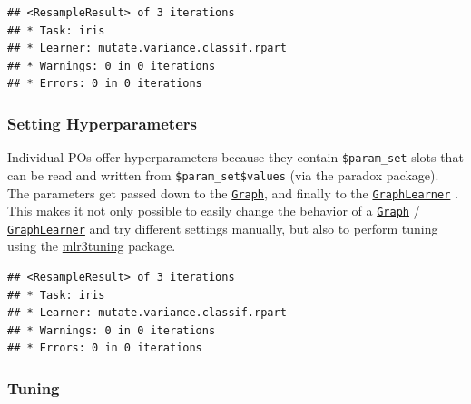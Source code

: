 \documentclass[]{article}
\newenvironment{Shaded}{\begin{snugshade}}{\end{snugshade}}
\newcommand{\DataTypeTok}[1]{\textcolor[rgb]{0.13,0.29,0.53}{#1}}
\newcommand{\DecValTok}[1]{\textcolor[rgb]{0.00,0.00,0.81}{#1}}
\newcommand{\FloatTok}[1]{\textcolor[rgb]{0.00,0.00,0.81}{#1}}
\newcommand{\KeywordTok}[1]{\textcolor[rgb]{0.13,0.29,0.53}{\textbf{#1}}}
\newcommand{\NormalTok}[1]{#1}
\newcommand{\OperatorTok}[1]{\textcolor[rgb]{0.81,0.36,0.00}{\textbf{#1}}}
\newcommand{\StringTok}[1]{\textcolor[rgb]{0.31,0.60,0.02}{#1}}
\renewenvironment{Shaded} {\begin{snugshade}\small} {\end{snugshade}}
\begin{document}
\begin{verbatim}
## <ResampleResult> of 3 iterations
## * Task: iris
## * Learner: mutate.variance.classif.rpart
## * Warnings: 0 in 0 iterations
## * Errors: 0 in 0 iterations
\end{verbatim}

\hypertarget{pipe-hyperpars}{%
\subsubsection{Setting Hyperparameters}\label{pipe-hyperpars}}

Individual POs offer hyperparameters because they contain \texttt{\$param\_set} slots that can be read and written from \texttt{\$param\_set\$values} (via the paradox package).
The parameters get passed down to the \href{https://mlr3pipelines.mlr-org.com/reference/Graph.html}{\texttt{Graph}}, and finally to the \href{https://mlr3pipelines.mlr-org.com/reference/mlr_learners_graph.html}{\texttt{GraphLearner}} .
This makes it not only possible to easily change the behavior of a \href{https://mlr3pipelines.mlr-org.com/reference/Graph.html}{\texttt{Graph}} / \href{https://mlr3pipelines.mlr-org.com/reference/mlr_learners_graph.html}{\texttt{GraphLearner}} and try different settings manually, but also to perform tuning using the \href{https://mlr3tuning.mlr-org.com}{mlr3tuning} package.

\begin{Shaded}
\end{Shaded}

\begin{verbatim}
## <ResampleResult> of 3 iterations
## * Task: iris
## * Learner: mutate.variance.classif.rpart
## * Warnings: 0 in 0 iterations
## * Errors: 0 in 0 iterations
\end{verbatim}

\hypertarget{pipe-tuning}{%
\subsubsection{Tuning}\label{pipe-tuning}}
\end{document}
